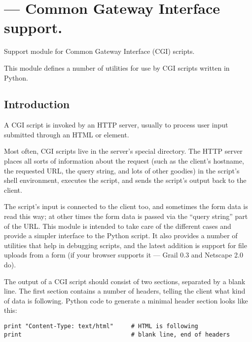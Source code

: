 \section{ ---
         Common Gateway Interface support.}




Support module for Common Gateway Interface (CGI) scripts.%

This module defines a number of utilities for use by CGI scripts
written in Python.

\subsection{Introduction}

A CGI script is invoked by an HTTP server, usually to process user
input submitted through an HTML  or  element.

Most often, CGI scripts live in the server's special 
directory.  The HTTP server places all sorts of information about the
request (such as the client's hostname, the requested URL, the query
string, and lots of other goodies) in the script's shell environment,
executes the script, and sends the script's output back to the client.

The script's input is connected to the client too, and sometimes the
form data is read this way; at other times the form data is passed via
the ``query string'' part of the URL.  This module is intended
to take care of the different cases and provide a simpler interface to
the Python script.  It also provides a number of utilities that help
in debugging scripts, and the latest addition is support for file
uploads from a form (if your browser supports it --- Grail 0.3 and
Netscape 2.0 do).

The output of a CGI script should consist of two sections, separated
by a blank line.  The first section contains a number of headers,
telling the client what kind of data is following.  Python code to
generate a minimal header section looks like this:

\begin{verbatim}
print "Content-Type: text/html"     # HTML is following
print                               # blank line, end of headers
\end{verbatim}

